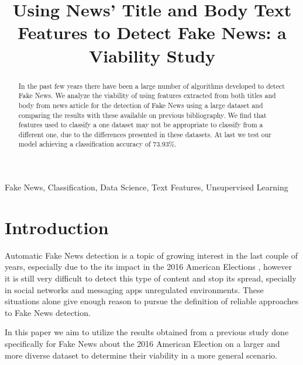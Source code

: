 \documentclass[conference]{IEEEtran}
\begin{document}
\title{ Using News' Title and Body Text Features to Detect Fake News: a Viability Study}


\author{
}

\maketitle

\begin{abstract}

In the past few years there have been a large number of algorithms developed to detect
Fake News. We analyze the viability of using features extracted from both titles and
body from news article for the detection of Fake News using a large dataset and comparing
the results with these available on previous bibliography. We find that features used
to classify a one dataset may not be appropriate to classify from a different one, due
to the differences presented in these datasets. At last we test our model achieving a
classification accuracy of 73.93\%.

\end{abstract}

\begin{IEEEkeywords}
Fake News, Classification, Data Science, Text Features, Unsupervised Learning
\end{IEEEkeywords}

\section{Introduction}

Automatic Fake News detection is a topic of growing interest in the last couple of years,
especially due to the its impact in the 2016 American Elections \cite{allcott_gentzkow_2017}\cite{dey_rafi_parash_arko_chakrabarty_2018},
however it is still very difficult to detect this type of content and stop its spread,
specially in social networks and messaging apps unregulated environments. These situations
alone give enough reason to pursue the definition of reliable approaches to Fake News detection.

In this paper we aim to utilize the results obtained from a previous study done specifically for Fake News
about the 2016 American Election \cite{horne_2017} on a larger and more diverse dataset to determine
their viability in a more general scenario.
\end{document}
